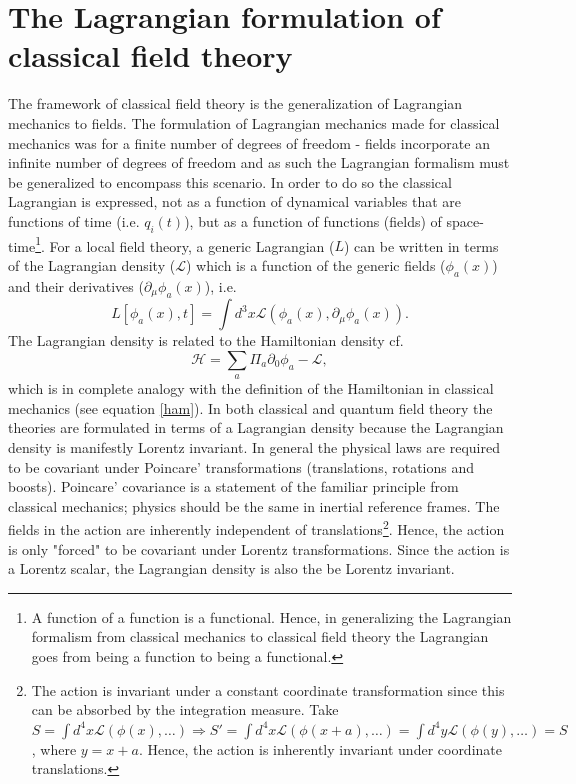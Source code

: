 \section{The Lagrangian formulation of classical field theory}
The framework of classical field theory is the generalization of Lagrangian mechanics to fields. The formulation of Lagrangian mechanics made for classical mechanics was for a finite number of degrees of freedom - fields incorporate an infinite number of degrees of freedom and as such the Lagrangian formalism must be generalized to encompass this scenario. In order to do so the classical Lagrangian is expressed, not as a function of dynamical variables that are functions of time (i.e. $q_i(t)$), but as a function of functions (fields) of space-time\footnote{A function of a function is a functional. Hence, in generalizing the Lagrangian formalism from classical mechanics to classical field theory the Lagrangian goes from being a function to being a functional.}. For a local field theory, a generic Lagrangian ($L$) can be written in terms of the Lagrangian density ($\mathcal{L}$) which is a function of the generic fields ($\phi_a(x)$) and their derivatives ($\partial_\mu\phi_a(x)$),  i.e.
\begin{equation}
	L[\phi_a(x),t]=\int d^3x\mathcal{L}(\phi_a(x),\partial_\mu\phi_a(x)).
\end{equation} 
The Lagrangian density is related to the Hamiltonian density cf.
\begin{equation}
	\mathcal{H}=\sum_a\Pi_a\partial_0\phi_a-\mathcal{L},
	\label{h1}
\end{equation} 
which is in complete analogy with the definition of the Hamiltonian in classical mechanics (see equation \eqref{ham}). In both classical and quantum field theory the theories are formulated in terms of a Lagrangian density because the Lagrangian density is manifestly Lorentz invariant. In general the physical laws are required to be covariant under Poincare' transformations (translations, rotations and boosts). Poincare' covariance is a statement of the familiar principle from classical mechanics; physics should be the same in inertial reference frames. The fields in the action are inherently independent of translations\footnote{The action is invariant under a constant coordinate transformation since this can be absorbed by the integration measure. Take $S=\int d^4x\mathcal{L}(\phi(x),\dots)\Rightarrow S'=\int d^4x\mathcal{L}(\phi(x+a),\dots)=\int d^4y\mathcal{L}(\phi(y),\dots)=S$, where $y=x+a$. Hence, the action is inherently invariant under coordinate translations.}. Hence, the action is only "forced" to be covariant under Lorentz transformations. Since the action is a Lorentz scalar, the Lagrangian density is also the be Lorentz invariant. 

